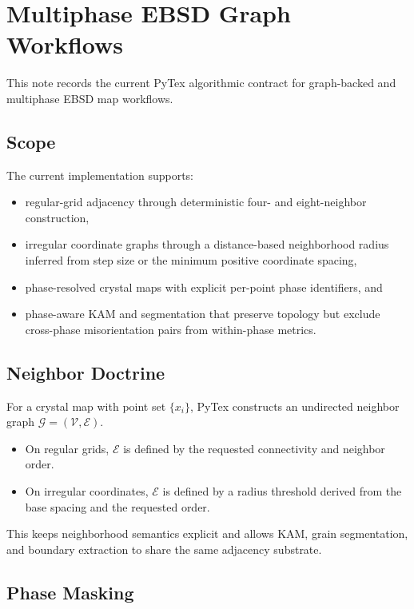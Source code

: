 \section{Multiphase EBSD Graph Workflows}

This note records the current PyTex algorithmic contract for graph-backed and multiphase EBSD map
workflows.

\subsection{Scope}

The current implementation supports:

\begin{itemize}
  \item regular-grid adjacency through deterministic four- and eight-neighbor construction,
  \item irregular coordinate graphs through a distance-based neighborhood radius inferred from step
    size or the minimum positive coordinate spacing,
  \item phase-resolved crystal maps with explicit per-point phase identifiers, and
  \item phase-aware KAM and segmentation that preserve topology but exclude cross-phase
    misorientation pairs from within-phase metrics.
\end{itemize}

\subsection{Neighbor Doctrine}

For a crystal map with point set $\{x_i\}$, PyTex constructs an undirected neighbor graph
$\mathcal{G} = (\mathcal{V}, \mathcal{E})$.

\begin{itemize}
  \item On regular grids, $\mathcal{E}$ is defined by the requested connectivity and neighbor
    order.
  \item On irregular coordinates, $\mathcal{E}$ is defined by a radius threshold derived from the
    base spacing and the requested order.
\end{itemize}

This keeps neighborhood semantics explicit and allows KAM, grain segmentation, and boundary
extraction to share the same adjacency substrate.

\subsection{Phase Masking}

